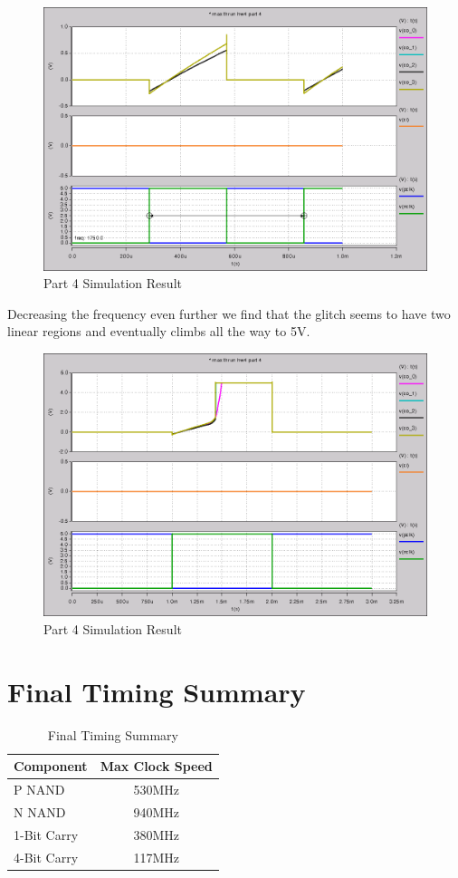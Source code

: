 \documentclass{article}
\begin{document}
\begin{figure}[H]
    \centering
    \includegraphics[width=0.8\linewidth]{../part_4.png}
    \caption{Part 4 Simulation Result}
\end{figure}

Decreasing the frequency even further we find that the glitch seems to have
two linear regions and eventually climbs all the way to 5V.

\begin{figure}[H]
    \centering
    \includegraphics[width=0.8\linewidth]{../part_4_slow.png}
    \caption{Part 4 Simulation Result}
\end{figure}

\newpage
\section*{Final Timing Summary}

\begin{table}[H]
    \centering
    \begin{tabular}{lc}
        \toprule
        \textbf{Component} & \textbf{Max Clock Speed} \\
        \midrule
        P NAND & 530MHz \\
        N NAND & 940MHz \\
   1-Bit Carry & 380MHz \\
   4-Bit Carry & 117MHz \\
        \bottomrule
    \end{tabular}
    \caption{Final Timing Summary}
\end{table}
\end{document}
